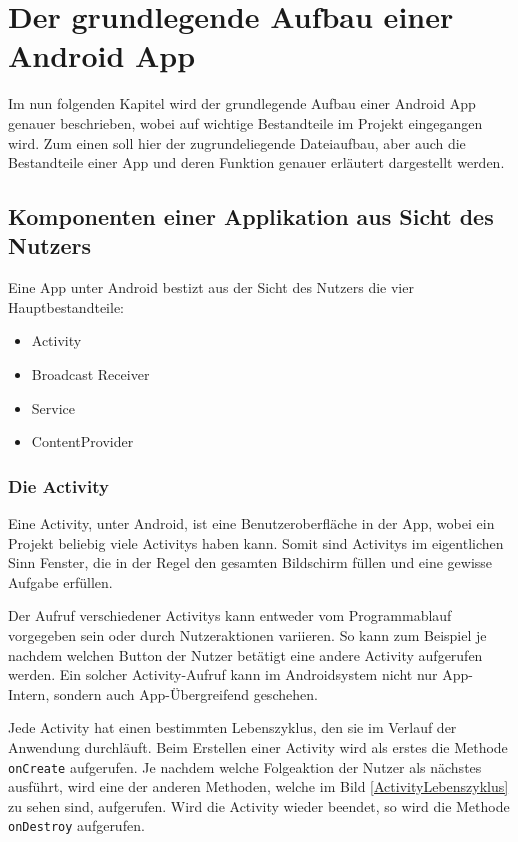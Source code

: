 \section{Der grundlegende Aufbau einer Android App}
Im nun folgenden Kapitel wird der grundlegende Aufbau einer Android App genauer beschrieben, wobei auf wichtige Bestandteile im Projekt eingegangen wird.
Zum einen soll hier der zugrundeliegende Dateiaufbau, aber auch die Bestandteile einer App und deren Funktion genauer erl\"autert dargestellt werden. \cite{Android44}

\subsection{Komponenten einer Applikation aus Sicht des Nutzers}
Eine App unter Android bestizt aus der Sicht des Nutzers die vier Hauptbestandteile:
\begin{itemize}
 \item Activity
 \item Broadcast Receiver
 \item Service
 \item ContentProvider
\end{itemize}

\subsubsection{Die Activity} \label{Die Activity aus Nutzersicht}
Eine Activity, unter Android, ist eine Benutzeroberfl\"ache in der App, wobei ein Projekt beliebig viele Activitys haben kann. Somit sind Activitys im eigentlichen Sinn Fenster, die in der Regel den gesamten Bildschirm f\"ullen und eine gewisse Aufgabe erf\"ullen. \cite{Kuehn12}

Der Aufruf verschiedener Activitys kann entweder vom Programmablauf vorgegeben sein oder durch Nutzeraktionen variieren. So kann zum Beispiel je nachdem welchen Button der Nutzer bet\"atigt eine andere Activity aufgerufen werden. Ein solcher Activity-Aufruf kann im Androidsystem nicht nur App-Intern, sondern auch App-\"Ubergreifend geschehen. \cite{Android44}

Jede Activity hat einen bestimmten Lebenszyklus, den sie im Verlauf der Anwendung durchl\"auft. Beim Erstellen einer Activity wird als erstes die Methode \texttt{onCreate} aufgerufen. Je nachdem welche Folgeaktion der Nutzer als n\"achstes ausf\"uhrt, wird eine der anderen Methoden, welche im Bild \ref{ActivityLebenszyklus} zu sehen sind, aufgerufen. Wird die Activity wieder beendet, so wird die Methode \texttt{onDestroy} aufgerufen. 

